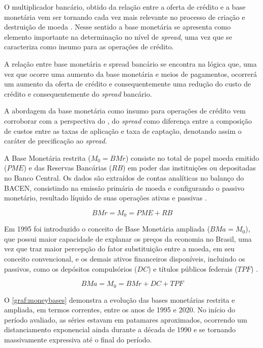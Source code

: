\documentclass[
  12pt,
  12pt,
  openright,
  oneside,
  a4paper,
  chapter=TITLE,
  section=TITLE,
  subsection=TITLE,
  subsubsection=TITLE,
  portugues,
  sumario=tradicional]{abntex2}
\begin{document}
O multiplicador bancário, obtido da relação entre a oferta de crédito e a base monetária vem ser tornando cada vez mais relevante no processo de criação e destruição de moeda \cite{bacen:juros:1999, rey:2017, almonacid:1976}. Nesse sentido a base monetária se apresenta como elemento importante na determinação no nível de \emph{spread}, uma vez que se caracteriza como insumo para as operações de crédito.

A relação entre base monetária e spread bancário se encontra na lógica que, uma vez que ocorre uma aumento da base monetária e meios de pagamentos, ocorrerá um aumento da oferta de crédito e consequentemente uma redução do custo de crédito e consequentemente do \emph{spread} bancário.

A abordagem da base monetária como insumo para operações de crédito vem corroborar com a perspectiva do \cite{bacen:juros:1999}, do \emph{spread} como diferença entre a composição de custos entre as taxas de aplicação e taxa de captação, denotando assim o caráter de precificação ao \emph{spread}.

A Base Monetária restrita (\(M_0 = BMr\)) consiste no total de papel moeda emitido (\(PME\)) e das Reservas Bancárias (\(RB\)) em poder das instituições ou depositadas no Banco Central. Os dados são extraídos de contas analíticas no balanço do BACEN, consistindo na emissão primária de moeda e configurando o passivo monetário, resultado líquido de suas operações ativas e passivas \cite{bcb:2019}.

\begin{equation}
BMr = M_0 = PME + RB
\end{equation}

Em 1995 foi introduzido o conceito de Base Monetária ampliada (\(BMa = M_0\)), que possui maior capacidade de explanar os preços da economia no Brasil, uma vez que traz maior percepção do fator substituição entre a moeda, em seu conceito convencional, e os demais ativos financeiros disponíveis, incluindo os passivos, como os depósitos compulsórios (\(DC\)) e títulos públicos federais (\(TPF\)) \cite{bcb:2019}.

\begin{equation}
BMa = M_0 = BMr + DC +  TPF
\end{equation}

O \autoref{graf:moneybases} demonstra a evolução das bases monetárias restrita e ampliada, em termos correntes, entre os anos de 1995 e 2020. No início do período avaliado, as séries estavam em patamares aproximados, ocorrendo um distanciamento exponencial ainda durante a década de 1990 e se tornando massivamente expressiva até o final do período.
\end{document}

